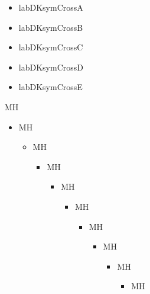 \documentclass[a4paper]{article}%
\begin{document}
\begin{itemize}[labDKCrossA]
\item%
    labDKsymCrossA
\end{itemize}
\begin{itemize}[labDKCrossB]
\item%
    labDKsymCrossB
\end{itemize}
\begin{itemize}[labDKCrossC]
\item%
    labDKsymCrossC
\end{itemize}
\begin{itemize}[labDKCrossD]
\item%
    labDKsymCrossD
\end{itemize}
\begin{itemize}[labDKCrossE]
\item%
    labDKsymCrossE
\end{itemize}
MH





\clearpage
\begin{itemize}
    \item MH
\begin{itemize}
    \item MH
\begin{itemize}
    \item MH
\begin{itemize}
    \item MH
\begin{itemize}
    \item MH
\begin{itemize}
    \item MH
\begin{itemize}
    \item MH
\begin{itemize}
    \item MH
\begin{itemize}
    \item MH
\end{itemize}
\end{itemize}
\end{itemize}
\end{itemize}
\end{itemize}
\end{itemize}
\end{itemize}
\end{itemize}
\end{itemize}
\end{document}
